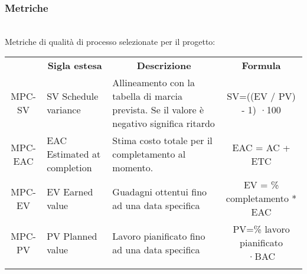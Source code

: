 \subsubsection{Metriche}\mbox{}\\
Metriche di qualità di processo selezionate per il progetto:
\begin{table}[H]
    \centering
    \renewcommand{\arraystretch}{1.8}
    \begin{tabular}{| c | p{4.2cm} | p{5cm} |c  }
        \rowcolor[HTML]{a52a2a}
        \multicolumn{1}{c}{\color[HTML]{FFFFFF} \textbf{Codice}}       &
        \multicolumn{1}{c}{\color[HTML]{FFFFFF} \textbf{Sigla estesa}} &
        \multicolumn{1}{c}{\color[HTML]{FFFFFF} \textbf{Descrizione}}  &
        \multicolumn{1}{c}{\color[HTML]{FFFFFF} \textbf{Formula}}                                                                                                                                                                                                                             \\
        MPC-SV                                                         & SV Schedule variance            & Allineamento con la tabella di marcia prevista. Se il valore è negativo significa ritardo & SV=((EV / PV) - 1) ·100                                                                \\
        MPC-EAC                                                        & EAC Estimated at completion     & Stima costo totale per il completamento al momento.                                       & EAC = AC + ETC                                                                         \\
        MPC-EV                                                         & EV Earned value                 & Guadagni ottentui fino ad una data specifica                                              & EV = \% completamento * EAC                                                            \\
        MPC-PV                                                         & PV Planned value                & Lavoro pianificato fino ad una data specifica                                             & PV=\% lavoro pianificato ·BAC                                                          \\                                                                                                                                                   & \\

\end{tabular}
\end{table}
